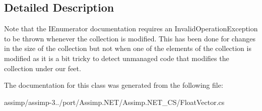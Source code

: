 \subsection{Detailed Description}
Note that the I\+Enumerator documentation requires an Invalid\+Operation\+Exception to be thrown whenever the collection is modified. This has been done for changes in the size of the collection but not when one of the elements of the collection is modified as it is a bit tricky to detect unmanaged code that modifies the collection under our feet. 

The documentation for this class was generated from the following file\+:\begin{DoxyCompactItemize}
\item 
assimp/assimp-\/3../port/\+Assimp.\+N\+E\+T/\+Assimp.\+N\+E\+T\+\_\+\+C\+S/Float\+Vector.\+cs\end{DoxyCompactItemize}
